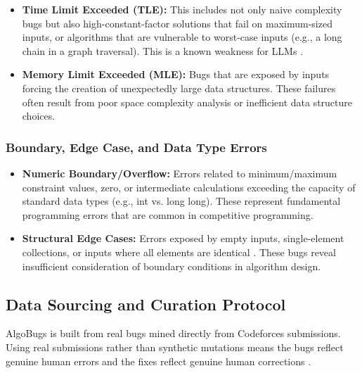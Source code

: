 \begin{itemize}
    \item \textbf{Time Limit Exceeded (TLE):} This includes not only naive complexity bugs but also high-constant-factor solutions that fail on maximum-sized inputs, or algorithms that are vulnerable to worst-case inputs (e.g., a long chain in a graph traversal). This is a known weakness for LLMs \cite{wang2025robustness, cao2025tcgbench}.
    
    \item \textbf{Memory Limit Exceeded (MLE):} Bugs that are exposed by inputs forcing the creation of unexpectedly large data structures. These failures often result from poor space complexity analysis or inefficient data structure choices.
\end{itemize}

\subsubsection{Boundary, Edge Case, and Data Type Errors}

\begin{itemize}
    \item \textbf{Numeric Boundary/Overflow:} Errors related to minimum/maximum constraint values, zero, or intermediate calculations exceeding the capacity of standard data types (e.g., int vs. long long). These represent fundamental programming errors that are common in competitive programming.
    
    \item \textbf{Structural Edge Cases:} Errors exposed by empty inputs, single-element collections, or inputs where all elements are identical \cite{wang2025robustness}. These bugs reveal insufficient consideration of boundary conditions in algorithm design.
\end{itemize}

\subsection{Data Sourcing and Curation Protocol}

AlgoBugs is built from real bugs mined directly from Codeforces submissions. Using real submissions rather than synthetic mutations means the bugs reflect genuine human errors and the fixes reflect genuine human corrections \cite{huang2024competition, haque2023fixeval}.

